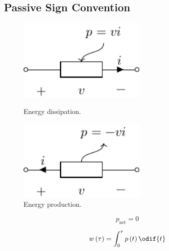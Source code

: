 \documentclass{article}
\begin{document}
\subsection{Passive Sign Convention}
\begin{figure}[H]
    \centering
    \begin{minipage}[H]{0.48\textwidth}
        \centering
        \includegraphics[height = 4cm, keepaspectratio = true]{figures/passive_component.pdf}
        \caption{Energy dissipation.}
    \end{minipage}\hfill
    \begin{minipage}[H]{0.48\textwidth}
        \centering
        \includegraphics[height = 4cm, keepaspectratio = true]{figures/active_component.pdf}
        \caption{Energy production.}
    \end{minipage}
\end{figure}
\begin{theorem}
    \begin{equation*}
        p_{\mathrm{net}} = 0
    \end{equation*}
\end{theorem}
\begin{theorem}[Energy]
    \begin{equation*}
        w\left( \tau \right) = \int_0^\tau p\left( t \right) \odif{t}
    \end{equation*}
\end{theorem}
\end{document}
